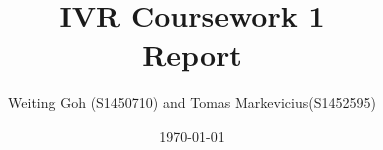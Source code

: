 \documentclass[12pt, a4paper]{article}
\title{IVR Coursework 1 \\ Report}
\author{Weiting Goh (S1450710) and Tomas Markevicius(S1452595)}
\date{\today}
\begin{document}
\maketitle





\nocite{*}


\end{document}
